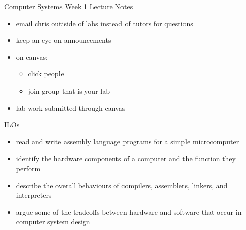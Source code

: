 \documentclass[12pt]{letter}
\begin{document}
\huge
Computer Systems Week 1 Lecture Notes

\normalsize
\begin{itemize}
    \item email chris outiside of labs instead of tutors for questions
    \item keep an eye on announcements
    \item on canvas:
    \begin{itemize}
        \item click people
        \item join group that is your lab
    \end{itemize}
    \item lab work submitted through canvas
\end{itemize}

\large
ILOs

\normalsize
\begin{itemize}
    \item read and write assembly language programs for a simple microcomputer
    \item identify the hardware components of a computer and the function they perform
    \item describe the overall behaviours of compilers, assemblers, linkers, and interpreters
    \item argue some of the tradeoffs between hardware and software that occur in computer system design
\end{itemize}
\end{document}
